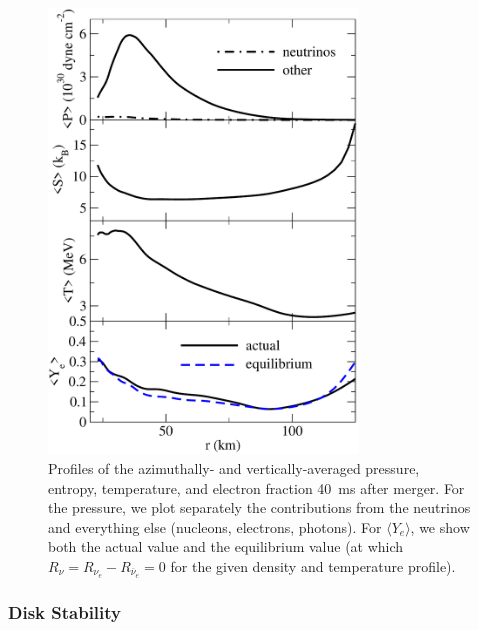 \begin{figure}
\includegraphics[width=8.2cm]{Figures/profiles}
\caption[Radial profiles of disk thermodynamics]{
Profiles of the azimuthally- and vertically-averaged pressure, entropy, temperature, and
electron fraction 40~ms after merger. For the pressure, we plot separately
the contributions from the neutrinos and everything else (nucleons,
electrons, photons).  For $\langle Y_e \rangle$, we show both the actual value and the
equilibrium value (at which $R_{\nu}=R_{\nu_e}-R_{\overline{\nu}_e}=0$ for the
given density and temperature profile).
}
\label{fig:profiles}
\end{figure}

\subsubsection{Disk Stability}

